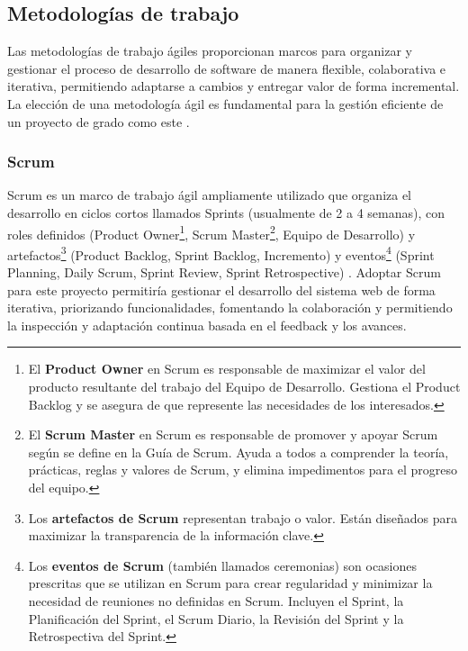 \subsection{Metodologías de trabajo}
Las metodologías de trabajo ágiles proporcionan marcos para organizar y gestionar el proceso de desarrollo de software de manera flexible, colaborativa e iterativa, permitiendo adaptarse a cambios y entregar valor de forma incremental.
La elección de una metodología ágil es fundamental para la gestión eficiente de un proyecto de grado como este \parencite{Beck2001}.

\subsubsection{Scrum}
Scrum es un marco de trabajo ágil ampliamente utilizado que organiza el desarrollo en ciclos cortos llamados Sprints (usualmente de 2 a 4 semanas), con roles definidos (Product Owner\footnote{El \textbf{Product Owner} en Scrum es responsable de maximizar el valor del producto resultante del trabajo del Equipo de Desarrollo.
Gestiona el Product Backlog y se asegura de que represente las necesidades de los interesados.}, Scrum Master\footnote{El \textbf{Scrum Master} en Scrum es responsable de promover y apoyar Scrum según se define en la Guía de Scrum.
Ayuda a todos a comprender la teoría, prácticas, reglas y valores de Scrum, y elimina impedimentos para el progreso del equipo.}, Equipo de Desarrollo) y artefactos\footnote{Los \textbf{artefactos de Scrum} representan trabajo o valor.
Están diseñados para maximizar la transparencia de la información clave.} (Product Backlog, Sprint Backlog, Incremento) y eventos\footnote{Los \textbf{eventos de Scrum} (también llamados ceremonias) son ocasiones prescritas que se utilizan en Scrum para crear regularidad y minimizar la necesidad de reuniones no definidas en Scrum.
Incluyen el Sprint, la Planificación del Sprint, el Scrum Diario, la Revisión del Sprint y la Retrospectiva del Sprint.} (Sprint Planning, Daily Scrum, Sprint Review, Sprint Retrospective) \parencite{SchwaberSutherland2020}.
Adoptar Scrum para este proyecto permitiría gestionar el desarrollo del sistema web de forma iterativa, priorizando funcionalidades, fomentando la colaboración y permitiendo la inspección y adaptación continua basada en el feedback y los avances.

